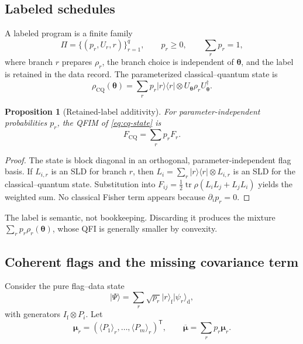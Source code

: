 \documentclass[11pt]{article}
\newtheorem{proposition}[proposition]{Proposition}
\theoremstyle{definition}
\theoremstyle{remark}
\newcommand{\PiProg}{\mathsf{\Pi}}
\newcommand{\tr}{\operatorname{tr}}
\newcommand{\cq}{\mathrm{CQ}}
\newcommand{\ket}[1]{\lvert #1\rangle}
\newcommand{\proj}[1]{\lvert #1\rangle\!\langle #1\rvert}
\begin{document}
\subsection{Labeled schedules}
A labeled program is a finite family
\begin{equation}
  \PiProg=\{(p_r,U_r,r)\}_{r=1}^{q},
  \qquad p_r\ge0,
  \qquad \sum_rp_r=1,
\end{equation}
where branch $r$ prepares $\rho_r$, the branch choice is independent of $\bm\theta$, and the label is retained in the data record. The parameterized classical--quantum state is
\begin{equation}
  \rho_{\cq}(\bm\theta)
  =\sum_r p_r\proj{r}\otimes
  U_{\bm\theta}\rho_rU_{\bm\theta}^{\dagger}.
  \label{eq:cq-state}
\end{equation}

\begin{proposition}[Retained-label additivity]
\label{prop:labeled-additivity}
For parameter-independent probabilities $p_r$, the QFIM of \cref{eq:cq-state} is
\begin{equation}
  F_{\cq}=\sum_r p_rF_r.
  \label{eq:labeled-additivity}
\end{equation}
\end{proposition}

\begin{proof}
The state is block diagonal in an orthogonal, parameter-independent flag basis. If $L_{i,r}$ is an SLD for branch $r$, then $L_i=\sum_r\proj{r}\otimes L_{i,r}$ is an SLD for the classical--quantum state. Substitution into $F_{ij}=\tfrac12\tr\rho(L_iL_j+L_jL_i)$ yields the weighted sum. No classical Fisher term appears because $\partial_i p_r=0$.
\end{proof}

The label is semantic, not bookkeeping. Discarding it produces the mixture $\sum_rp_r\rho_r(\bm\theta)$, whose QFI is generally smaller by convexity.

\subsection{Coherent flags and the missing covariance term}
Consider the pure flag--data state
\begin{equation}
  \ket{\Psi}
  =\sum_r\sqrt{p_r}\ket{r}_{\mathrm f}\ket{\psi_r}_{\mathrm d},
  \label{eq:coherent-flag}
\end{equation}
with generators $I_{\mathrm f}\otimes P_i$. Let
\begin{equation}
  \bm\mu_r=(\langle P_1\rangle_r,\ldots,\langle P_m\rangle_r)^{\mathsf T},
  \qquad
  \overline{\bm\mu}=\sum_rp_r\bm\mu_r.
\end{equation}
\end{document}
